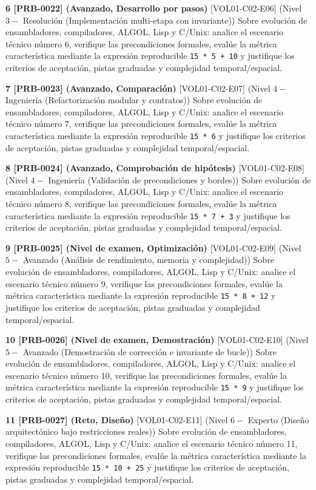 \documentclass{book}
\begin{document}
\begin{tcolorbox}[title={Ejercicios}, studiumworked, breakable]
\noindent\textbf{6 [PRB-0022] (Avanzado, Desarrollo por pasos)}
[VOL01-C02-E06] (Nivel \(3 -\) Resolución (Implementación multi-etapa con invariante)) Sobre evolución de ensambladores, compiladores, ALGOL, Lisp y C/Unix: analice el escenario técnico número 6, verifique las precondiciones formales, evalúe la métrica característica mediante la expresión reproducible \texttt{15 * 5 + 10} y justifique los criterios de aceptación, pistas graduadas y complejidad temporal/espacial.

\noindent\textbf{7 [PRB-0023] (Avanzado, Comparación)}
[VOL01-C02-E07] (Nivel \(4 -\) Ingeniería (Refactorización modular y contratos)) Sobre evolución de ensambladores, compiladores, ALGOL, Lisp y C/Unix: analice el escenario técnico número 7, verifique las precondiciones formales, evalúe la métrica característica mediante la expresión reproducible \texttt{15 * 6} y justifique los criterios de aceptación, pistas graduadas y complejidad temporal/espacial.

\noindent\textbf{8 [PRB-0024] (Avanzado, Comprobación de hipótesis)}
[VOL01-C02-E08] (Nivel \(4 -\) Ingeniería (Validación de precondiciones y bordes)) Sobre evolución de ensambladores, compiladores, ALGOL, Lisp y C/Unix: analice el escenario técnico número 8, verifique las precondiciones formales, evalúe la métrica característica mediante la expresión reproducible \texttt{15 * 7 + 3} y justifique los criterios de aceptación, pistas graduadas y complejidad temporal/espacial.

\noindent\textbf{9 [PRB-0025] (Nivel de examen, Optimización)}
[VOL01-C02-E09] (Nivel \(5 -\) Avanzado (Análisis de rendimiento, memoria y complejidad)) Sobre evolución de ensambladores, compiladores, ALGOL, Lisp y C/Unix: analice el escenario técnico número 9, verifique las precondiciones formales, evalúe la métrica característica mediante la expresión reproducible \texttt{15 * 8 + 12} y justifique los criterios de aceptación, pistas graduadas y complejidad temporal/espacial.

\noindent\textbf{10 [PRB-0026] (Nivel de examen, Demostración)}
[VOL01-C02-E10] (Nivel \(5 -\) Avanzado (Demostración de corrección e invariante de bucle)) Sobre evolución de ensambladores, compiladores, ALGOL, Lisp y C/Unix: analice el escenario técnico número 10, verifique las precondiciones formales, evalúe la métrica característica mediante la expresión reproducible \texttt{15 * 9} y justifique los criterios de aceptación, pistas graduadas y complejidad temporal/espacial.

\noindent\textbf{11 [PRB-0027] (Reto, Diseño)}
[VOL01-C02-E11] (Nivel \(6 -\) Experto (Diseño arquitectónico bajo restricciones reales)) Sobre evolución de ensambladores, compiladores, ALGOL, Lisp y C/Unix: analice el escenario técnico número 11, verifique las precondiciones formales, evalúe la métrica característica mediante la expresión reproducible \texttt{15 * 10 + 25} y justifique los criterios de aceptación, pistas graduadas y complejidad temporal/espacial.


\end{tcolorbox}
\end{document}
